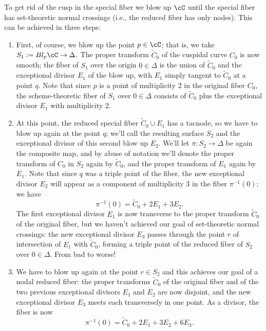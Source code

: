 
To get rid of the cusp in the special fiber we blow up $\cC$ until the special fiber has set-theoretic normal crossings (i.e., the reduced fiber has only nodes). This can be achieved in three steps:

\begin{enumerate}

\item First, of course, we blow up the point $p \in \cC$; that is, we take $S_1 := Bl_p\cC \to \Delta$. The proper transform $\tilde C_0$ of the cuspidal curve $C_0$ is now smooth; the fiber of $S_1$ over the origin $0 \in \Delta$ is the union of $\tilde C_0$ and the exceptional divisor $E_1$ of the blow up, with $E_1$ simply tangent to $
\tilde C_0$ at a point $q$. Note that since $p$ is a point of multiplicity 2 in the original fiber $C_0$,  the scheme-theoretic fiber of $S_1$ over $0 \in \Delta$ consists of $\tilde C_0$ plus the exceptional divisor $E_1$ with multiplicity 2.

\item At this point, the reduced special fiber $\tilde C_0 \cup E_1$ has a tacnode, so we have to blow up again at the point $q$; we'll call the resulting surface $S_2$ and the exceptional divisor of this second blow up $E_2$. We'll let $\pi : S_2 \to \Delta$ be again the composite map, and by abuse of notation we'll denote the proper transform of $C_0$ in $S_2$ again by $\tilde C_0$, and the proper transform of $E_1$ again by $E_1$. Note that since $q$ was a triple point of the fiber, the new exceptional divisor $E_2$ will appear as a component of multiplicity 3 in the fiber $\pi^{-1}(0)$; we have
$$
\pi^{-1}(0) = \tilde C_0 + 2E_1 + 3E_2.
$$
The first exceptional divisor $E_1$ is now transverse to the proper transform $\tilde C_0$ of the original fiber, but we haven't achieved our goal of set-theoretic normal crossings: the new exceptional divisor $E_3$ passes through the point $r$ of intersection of $E_1$ with $\tilde C_0$, forming a triple point of the reduced fiber of $S_2$ over $0 \in \Delta$. From bad to worse!

\item We have to blow up again at the point $r \in S_2$ and this achieves our goal of a nodal reduced fiber: the proper transforms $\tilde C_0$ of the original fiber and of the two previous exceptional divisors $E_1$ and $E_2$ are now disjoint, and the new exceptional divisor $E_3$ meets each transversely in one point. As a divisor, the fiber is now
$$
\pi^{-1}(0) = \tilde C_0 + 2E_1 + 3E_2 + 6E_3.
$$
\end{enumerate}

